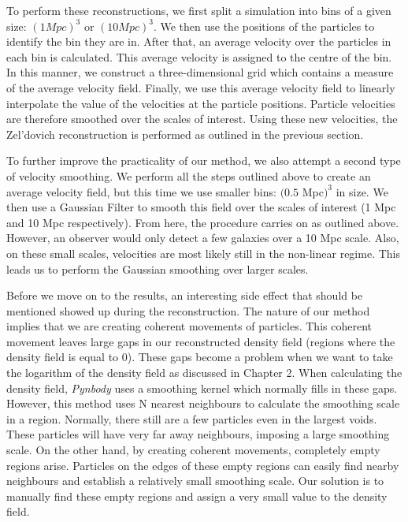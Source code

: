 To perform these reconstructions, we first split a simulation into bins of a given size: $(1 Mpc)^3$ or $(10 Mpc)^3$. We then use the positions of the particles to identify the bin they are in. After that, an average velocity over the particles in each bin is calculated. This average velocity is assigned to the centre of the bin. In this manner, we construct a three-dimensional grid which contains a measure of the average velocity field. Finally, we use this average velocity field to linearly interpolate the value of the velocities at the particle positions. Particle velocities are therefore smoothed over the scales of interest. Using these new velocities, the Zel'dovich reconstruction is performed as outlined in the previous section.

To further improve the practicality of our method, we also attempt a second type of velocity smoothing. We perform all the steps outlined above to create an average velocity field, but this time we use smaller bins: $(0.5$ Mpc$)^3$ in size. We then use a Gaussian Filter to smooth this field over the scales of interest (1 Mpc and 10 Mpc respectively). From here, the procedure carries on as outlined above. However, an observer would only detect a few galaxies over a 10 Mpc scale. Also, on these small scales, velocities are most likely still in the non-linear regime. This leads us to perform the Gaussian smoothing over larger scales.

Before we move on to the results, an interesting side effect that should be mentioned showed up during the reconstruction. The nature of our method implies that we are creating coherent movements of particles. This coherent movement leaves large gaps in our reconstructed density field (regions where the density field is equal to 0). These gaps become a problem when we want to take the logarithm of the density field as discussed in Chapter 2. When calculating the density field, \textit{Pynbody} uses a smoothing kernel which normally fills in these gaps. However, this method uses N nearest neighbours to calculate the smoothing scale in a region. Normally, there still are a few particles even in the largest voids. These particles will have very far away neighbours, imposing a large smoothing scale. On the other hand, by creating coherent movements, completely empty regions arise. Particles on the edges of these empty regions can easily find nearby neighbours and establish a relatively small smoothing scale. Our solution is to manually find these empty regions and assign a very small value to the density field. 

